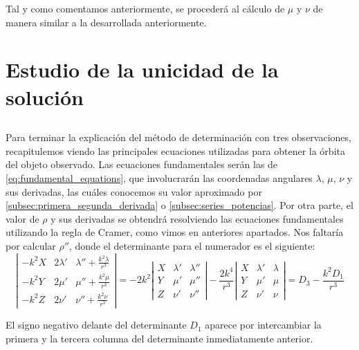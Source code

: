 \documentclass[11pt]{article}
\begin{document}
Tal y como comentamos anteriormente, se procederá al cálculo de $\mu$ y $\nu$ de manera similar a la desarrollada anteriormente.

\newpage


\section{Estudio de la unicidad de la solución}

\subsection{}
\label{subsec:fundamental_equations}
Para terminar la explicación del método de determinación con tres observaciones, recapitulemos viendo las principales ecuaciones utilizadas para obtener la órbita del objeto observado. Las ecuaciones fundamentales serán las de \eqref{eq:fundamental_equations}, que involucrarán las coordenadas angulares $\lambda$, $\mu$, $\nu$ y sus derivadas, las cuáles conocemos su valor aproximado por \ref{subsec:primera_segunda_derivada} o \ref{subsec:series_potencias}. Por otra parte, el valor de $\rho$ y sus derivadas se obtendrá resolviendo las ecuaciones fundamentales utilizando la regla de Cramer, como vimos en anteriores apartados. Nos faltaría por calcular $\rho''$, donde el determinante para el numerador es el siguiente: 
\[
\left|
\begin{array}{ccc}
-k^2X & 2\lambda' & \lambda''+\frac{k^2\lambda}{r^3}\\
-k^2Y & 2\mu' & \mu''+\frac{k^2\mu}{r^3}\\
-k^2Z & 2\nu' & \nu''+\frac{k^2\nu}{r^3}
\end{array}
\right|
=-2k^2
\left|
\begin{array}{ccc}
X & \lambda' & \lambda''\\
Y & \mu' & \mu''\\
Z & \nu' & \nu''
\end{array}
\right|
-\frac{2k^4}{r^3}
\left|
\begin{array}{ccc}
X & \lambda' & \lambda\\
Y & \mu' & \mu\\
Z & \nu' & \nu
\end{array}
\right|
=
D_3-\frac{k^2D_1}{r^3}
\]

El signo negativo delante del determinante $D_1$ aparece por intercambiar la primera y la tercera columna del determinante inmediatamente anterior.\\
\end{document}
